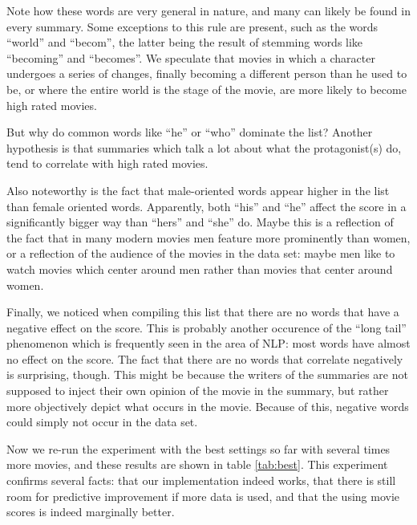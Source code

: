 \documentclass{article} %
\begin{document}
Note how these words are very general in nature, and many can likely be found in every summary. 
Some exceptions to this rule are present, such as the words ``world'' and ``becom'', the latter being the result of stemming words like ``becoming'' and ``becomes''.
We speculate that movies in which a character undergoes a series of changes, finally becoming a different person than he used to be, or where the entire world is the stage of the movie, are more likely to become high rated movies.

But why do common words like ``he'' or ``who'' dominate the list? 
Another hypothesis is that summaries which talk a lot about what the protagonist(s) do, tend to correlate with high rated movies.

Also noteworthy is the fact that male-oriented words appear higher in the list than female oriented words.
Apparently, both ``his'' and ``he'' affect the score in a significantly bigger way than ``hers'' and ``she'' do. 
Maybe this is a reflection of the fact that in many modern movies men feature more prominently than women, or a reflection of the audience of the movies in the data set: maybe men like to watch movies which center around men rather than movies that center around women.

Finally, we noticed when compiling this list that there are no words that have a negative effect on the score.
This is probably another occurence of the ``long tail'' phenomenon which is frequently seen in the area of NLP: most words have almost no effect on the score.
The fact that there are no words that correlate negatively is surprising, though.
This might be because the writers of the summaries are not supposed to inject their own opinion of the movie in the summary, but rather more objectively depict what occurs in the movie.
Because of this, negative words could simply not occur in the data set.

Now we re-run the experiment with the best settings so far with several times more movies, and these results are shown in table \ref{tab:best}. 
This experiment confirms several facts: that our implementation indeed works, that there is still room for predictive improvement if more data is used, and that the using movie scores is indeed marginally better.
\end{document}
